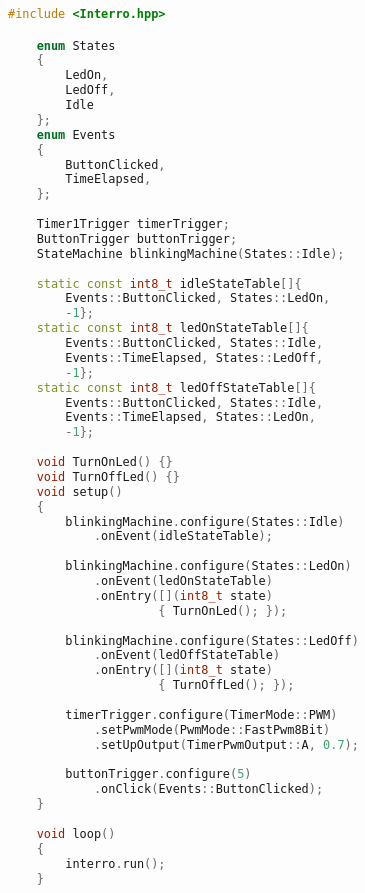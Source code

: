 \begin{lstlisting}[language=c++]      
    #include <Interro.hpp>

    enum States
    {
        LedOn,
        LedOff,
        Idle
    };
    enum Events
    {
        ButtonClicked,
        TimeElapsed,
    };
    
    Timer1Trigger timerTrigger;
    ButtonTrigger buttonTrigger;
    StateMachine blinkingMachine(States::Idle);
    
    static const int8_t idleStateTable[]{
        Events::ButtonClicked, States::LedOn,
        -1};    
    static const int8_t ledOnStateTable[]{
        Events::ButtonClicked, States::Idle,
        Events::TimeElapsed, States::LedOff,
        -1};
    static const int8_t ledOffStateTable[]{
        Events::ButtonClicked, States::Idle,
        Events::TimeElapsed, States::LedOn,
        -1};
    
    void TurnOnLed() {}  
    void TurnOffLed() {}     
    void setup()
    {
        blinkingMachine.configure(States::Idle)
            .onEvent(idleStateTable);
    
        blinkingMachine.configure(States::LedOn)
            .onEvent(ledOnStateTable)
            .onEntry([](int8_t state)
                     { TurnOnLed(); });
    
        blinkingMachine.configure(States::LedOff)
            .onEvent(ledOffStateTable)
            .onEntry([](int8_t state)
                     { TurnOffLed(); });
    
        timerTrigger.configure(TimerMode::PWM)
            .setPwmMode(PwmMode::FastPwm8Bit)
            .setUpOutput(TimerPwmOutput::A, 0.7);
    
        buttonTrigger.configure(5)
            .onClick(Events::ButtonClicked);
    }
    
    void loop()
    {
        interro.run();
    }
\end{lstlisting}
